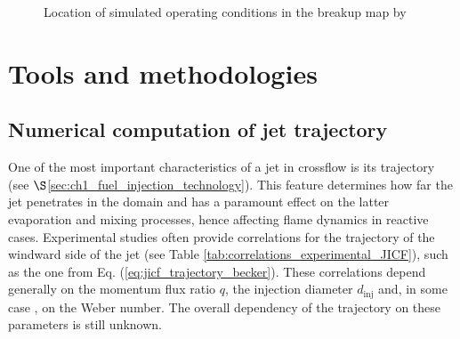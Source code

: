 \begin{figure}[ht]
     \centering
     \caption{Location of simulated operating conditions in the breakup map by \citeColor[wu_breakup_1997]}
      \label{fig:location_JICF_ops_in_breakup_map}
\end{figure}






\section{Tools and methodologies}
\label{sec:ch5_JICF_tools_and_methodologies}


\subsection{Numerical computation of jet trajectory}
	\label{sec:ch5_tools_jicf_trajectories}

One of the most important characteristics of a jet in crossflow is its trajectory (see $\S$\ref{sec:ch1_fuel_injection_technology}). This feature determines how far the jet penetrates in the domain and has a paramount effect on the latter evaporation and mixing processes, hence affecting flame dynamics in reactive cases. Experimental studies often provide correlations for the trajectory of the windward side of the jet (see Table \ref{tab:correlations_experimental_JICF}), such as the one from Eq. (\ref{eq:jicf_trajectory_becker}). These correlations depend generally on the momentum flux ratio $q$, the injection diameter $d_\mathrm{inj}$ and, in some case , on the Weber number. The overall dependency of the trajectory on these parameters is still unknown.

